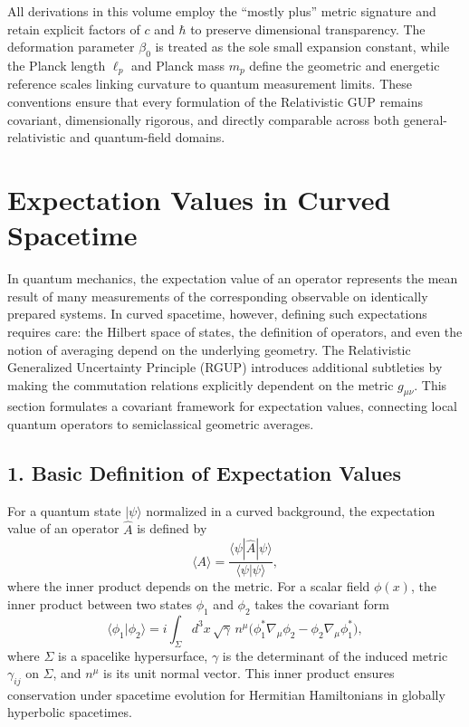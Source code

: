 \documentclass[11pt,oneside]{book}
\newenvironment{booknote}{
  \begin{tcolorbox}[
    colback=gray!3!white,
    colframe=gray!45!black,
    fonttitle=\bfseries,
    title=\textbf{Book Note},
  ]
}{\end{tcolorbox}}
\numberwithin{equation}{chapter}
\newcommand{\lp}{\ell_p}             %
\newcommand{\mpx}{m_p}               %
\newcommand{\betaz}{\beta_0}
\begin{document}
\begin{booknote}
All derivations in this volume employ the ``mostly plus'' metric signature and retain explicit factors of $c$ and $\hbar$ to preserve dimensional transparency.  
The deformation parameter $\betaz$ is treated as the sole small expansion constant, while the Planck length $\lp$ and Planck mass $\mpx$ define the geometric and energetic reference scales linking curvature to quantum measurement limits.  
These conventions ensure that every formulation of the Relativistic GUP remains covariant, dimensionally rigorous, and directly comparable across both general-relativistic and quantum-field domains.
\end{booknote}
\clearpage
\section{Expectation Values in Curved Spacetime}

In quantum mechanics, the expectation value of an operator represents the mean result of many measurements of the corresponding observable on identically prepared systems.  
In curved spacetime, however, defining such expectations requires care: the Hilbert space of states, the definition of operators, and even the notion of averaging depend on the underlying geometry.  
The Relativistic Generalized Uncertainty Principle (RGUP) introduces additional subtleties by making the commutation relations explicitly dependent on the metric $g_{\mu\nu}$.  
This section formulates a covariant framework for expectation values, connecting local quantum operators to semiclassical geometric averages.

\subsection*{1. Basic Definition of Expectation Values}

For a quantum state $|\psi\rangle$ normalized in a curved background, the expectation value of an operator $\hat{A}$ is defined by
\begin{equation}
\langle A \rangle
= \frac{\langle \psi | \hat{A} | \psi \rangle}
{\langle \psi | \psi \rangle},
\end{equation}
where the inner product depends on the metric.  
For a scalar field $\phi(x)$, the inner product between two states $\phi_1$ and $\phi_2$ takes the covariant form
\begin{equation}
\langle \phi_1 | \phi_2 \rangle
= i \int_{\Sigma} d^3x\,\sqrt{\gamma}\,
n^\mu \big(\phi_1^* \nabla_\mu \phi_2
- \phi_2 \nabla_\mu \phi_1^*\big),
\end{equation}
where $\Sigma$ is a spacelike hypersurface, $\gamma$ is the determinant of the induced metric $\gamma_{ij}$ on $\Sigma$, and $n^\mu$ is its unit normal vector.  
This inner product ensures conservation under spacetime evolution for Hermitian Hamiltonians in globally hyperbolic spacetimes.
\end{document}
